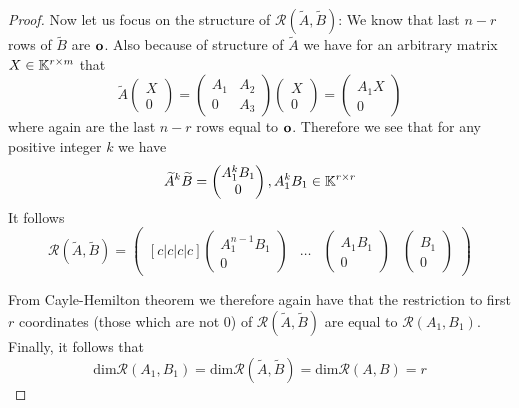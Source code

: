 \begin{proof}
	Now let us focus on the structure of $\mathcal{R}(\widetilde{A},\widetilde{B})$: We know that last $n-r$ rows of $\widetilde{B}$ are $\textbf{o}$. Also because of structure of $\widetilde{A}$ we have for an arbitrary matrix $X\in\mathbb{K}^{r\times m}$ that 
	\begin{equation*}
		\widetilde{A}
		\begin{pmatrix}
			X \\
			0
		\end{pmatrix}
		=
		\begin{pmatrix}
			A_1 & A_2 \\
			  0 & A_3
		\end{pmatrix}
		\begin{pmatrix}
			X \\
			0
		\end{pmatrix}
		=
		\begin{pmatrix}
			A_1X \\
			0
		\end{pmatrix}
	\end{equation*}
	where again are the last $n-r$ rows equal to $\textbf{o}$. Therefore we see that for any positive integer $k$ we have 
	\begin{equation*}
		\widetilde{A}^k\widetilde{B}=
		\begin{pmatrix}
			A_1^{k}B_1 \\
			0
        \end{pmatrix}
        ,A_1^kB_1\in\mathbb{K}^{r\times r}
    \end{equation*}
    It follows
    \begin{equation*}
        \mathcal{R}(\widetilde{A},\widetilde{B})=
        \begin{pmatrix}[c|c|c|c]
            \begin{pmatrix}
                A_1^{n-1}B_1 \\
                0 
            \end{pmatrix}
            & \ldots &
            \begin{pmatrix}
                A_1B_1 \\
                0 
            \end{pmatrix}
            &
            \begin{pmatrix}
                B_1 \\
                0 
            \end{pmatrix}
        \end{pmatrix}
    \end{equation*}
	
	From Cayle-Hemilton theorem we therefore again have that the restriction to first $r$ coordinates (those which are not 0) of $\mathcal{R}(\widetilde{A},\widetilde{B})$ are equal to $\mathcal{R}(A_1,B_1)$. Finally, it follows that $$\text{dim}\mathcal{R}(A_1,B_1)=\text{dim}\mathcal{R}(\widetilde{A},\widetilde{B})=\text{dim}\mathcal{R}(A,B)=r$$
\end{proof}

